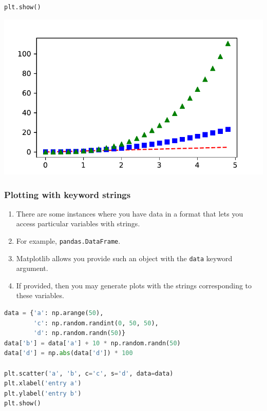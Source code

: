 \documentclass[UTF8,a4paper,12pt]{ctexart}  %
\providecommand{\tightlist}{\setlength{\itemsep}{0pt}\setlength{\parskip}{0pt}}
\newcommand{\passthrough}[1]{\lstset{mathescape=false}#1\lstset{mathescape=true}}
\begin{document}
\begin{lstlisting}[language=Python]
plt.show()
\end{lstlisting}

\begin{center}\includegraphics[width=0.9\linewidth]{python-visualization_files/figure-latex/unnamed-chunk-8-1} \end{center}

\hypertarget{plotting-with-keyword-strings}{%
\subsubsection{Plotting with keyword strings}\label{plotting-with-keyword-strings}}

\begin{enumerate}
\def\labelenumi{\arabic{enumi}.}
\tightlist
\item
  There are some instances where you have data in a format that lets
  you access particular variables with strings.
\item
  For example, \passthrough{\lstinline!pandas.DataFrame!}.
\item
  Matplotlib allows you provide such an object with the \passthrough{\lstinline!data!} keyword
  argument.
\item
  If provided, then you may generate plots with the strings
  corresponding to these variables.
\end{enumerate}

\begin{lstlisting}[language=Python]
data = {'a': np.arange(50),
        'c': np.random.randint(0, 50, 50),
        'd': np.random.randn(50)}
data['b'] = data['a'] + 10 * np.random.randn(50)
data['d'] = np.abs(data['d']) * 100

plt.scatter('a', 'b', c='c', s='d', data=data)
plt.xlabel('entry a')
plt.ylabel('entry b')
plt.show()
\end{lstlisting}
\end{document}
